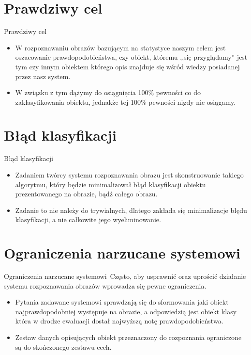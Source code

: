 \documentclass{beamer}
\begin{document}
\section{Prawdziwy cel}
\begin{frame}{Prawdziwy cel}
\begin{itemize}
\item W rozpoznawaniu obrazów bazującym na statystyce naszym celem jest oszacowanie prawdopodobieństwa, czy obiekt, któremu ,,się przyglądamy'' jest tym czy innym obiektem którego opis znajduje się wśród wiedzy posiadanej przez nasz system. 
\pause
\item W związku z tym dążymy do osiągnięcia 100\% pewności co do zaklasyfikowania obiektu, jednakże tej 100\% pewności nigdy nie osiągamy.
\end{itemize}
\end{frame}

\section{Błąd klasyfikacji}
\begin{frame}{Błąd klasyfikacji}
\begin{itemize}
\item Zadaniem twórcy systemu rozpoznawania obrazu jest skonstruowanie takiego algorytmu, który będzie minimalizował błąd klasyfikacji obiektu prezentowanego na obrazie, bądź całego obrazu.
\pause
\item Zadanie to nie należy do trywialnych, dlatego zakłada się minimalizacje błędu klasyfikacji, a nie całkowite jego wyeliminowanie.
\end{itemize}
\end{frame}

\section{Ograniczenia narzucane systemowi}
\begin{frame}{Ograniczenia narzucane systemowi}\
Często, aby usprawnić oraz uprościć działanie systemu rozpoznawania obrazów wprowadza się pewne ograniczenia.
\pause
\begin{itemize}
\item Pytania zadawane systemowi sprawdzają się do sformowania jaki obiekt najprawdopodobniej występuje na obrazie, a odpowiedzią jest obiekt klasy która w drodze ewaluacji dostał najwyższą notę prawdopodobieństwa.
\pause
\item Zestaw danych opisujących obiekt przeznaczony do rozpoznania ograniczone są do skończonego zestawu cech.
\end{itemize}
\end{frame}
\end{document}
